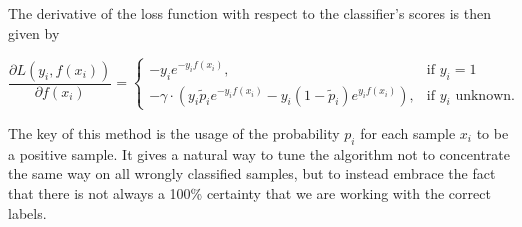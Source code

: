 The derivative of the loss function with respect to the classifier's scores is then given by 

\begin{equation*}
 \frac{\partial L(y_i,f(x_i))}{\partial f(x_i)} = 
    \begin{cases}
	-y_i e^{-y_i f(x_i)}, & \text{if $y_i = 1$}\\
	-\gamma \cdot \left(y_i \tilde p_i e^{-y_i f(x_i)} - y_i (1 - \tilde p_i) e^{y_i f(x_i)} \right), & \text{if $y_i$ unknown.}
      \end{cases}
\end{equation*}

The key of this method is the usage of the probability $p_i$ for each sample $x_i$ to be a positive sample. 
It gives a natural way to tune the algorithm not to concentrate the same way on all wrongly classified samples, but to instead embrace the fact that there is not always a 100\% certainty that we are working with the correct labels.

